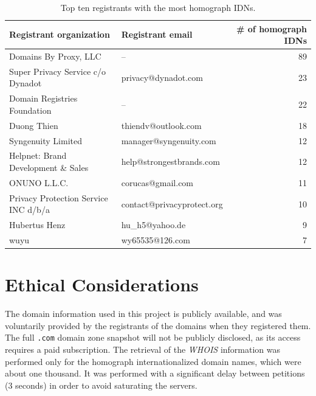 \documentclass[letterpaper,twocolumn,10pt]{article}
\begin{document}
\begin{table}[ht!]
\centering
\begin{tabular}{llr}
\hline
Registrant organization              & Registrant email           & \# of homograph IDNs \\ \hline
Domains By Proxy, LLC                & --                         & 89                   \\
Super Privacy Service c/o Dynadot    & privacy@dynadot.com        & 23                   \\
Domain Registries Foundation         & --                         & 22                   \\
Duong Thien                          & thiendv@outlook.com        & 18                   \\
Syngenuity Limited                   & manager@syngenuity.com     & 12                   \\
Helpnet: Brand Development \& Sales  & help@strongestbrands.com   & 12                   \\
ONUNO L.L.C.                         & corucas@gmail.com          & 11                   \\
Privacy Protection Service INC d/b/a & contact@privacyprotect.org & 10                   \\
Hubertus Henz                        & hu\_h5@yahoo.de            & 9                    \\
wuyu                                 & wy65535@126.com            & 7                    \\ \hline
\end{tabular}
\caption{Top ten registrants with the most homograph IDNs.}
\label{top-registrants-homograph-idns}
\end{table}

\section{Ethical Considerations}
The domain information used in this project is publicly available, and was voluntarily provided by the registrants of the domains when they registered them.
The full \texttt{.com} domain zone snapshot will not be publicly disclosed, as its access requires a paid subscription.
The retrieval of the \textit{WHOIS} information was performed only for the homograph internationalized domain names, which were about one thousand.
It was performed with a significant delay between petitions (3 seconds) in order to avoid saturating the servers.
\end{document}
